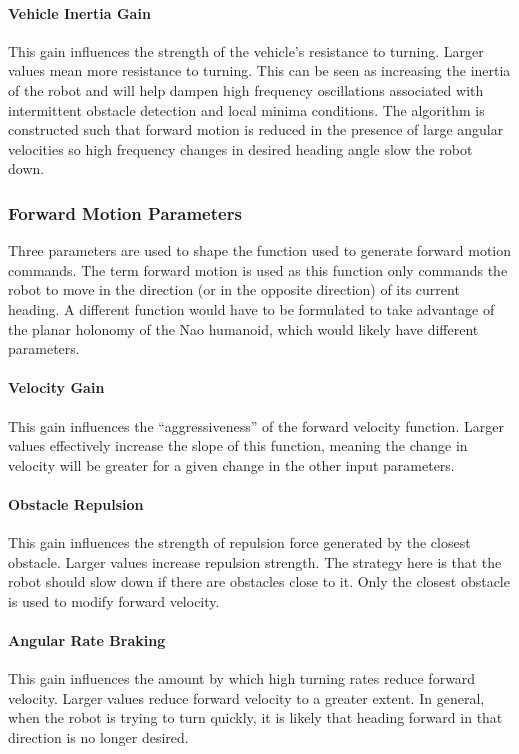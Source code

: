 \paragraph{Vehicle Inertia Gain}            
This gain influences the strength of the vehicle's resistance 
to turning. Larger values mean more resistance to turning. This can be seen
as increasing the inertia of the robot and will help dampen high frequency oscillations
associated with intermittent obstacle detection and local minima conditions.
The algorithm is constructed such that forward motion is reduced in the presence of large
angular velocities so high frequency changes in desired heading angle slow the robot down.

\subsubsection{Forward Motion Parameters}
Three parameters are used to shape the function used to generate forward motion
commands. The term forward motion is used as this function only commands the
robot to move in the direction (or in the opposite direction) of its current heading.
A different function would have to be formulated to take advantage of the planar
holonomy of the Nao humanoid, which would likely have different parameters.

\paragraph{Velocity Gain}              
This gain influences the ``aggressiveness'' of the forward velocity function. 
Larger values effectively increase the slope of this function, meaning the change in
velocity will be greater for a given change in the other input parameters.

\paragraph{Obstacle Repulsion}  
This gain influences the strength of repulsion force generated by the closest obstacle.
Larger values increase repulsion strength.
The strategy here is that the robot should slow down if there are obstacles close to it.
Only the closest obstacle is used to modify forward velocity.

\paragraph{Angular Rate Braking}        
This gain influences the amount by which high turning rates reduce forward velocity.
Larger values reduce forward velocity to a greater extent.
In general, when the robot is trying to turn quickly, it is likely that heading forward in that
direction is no longer desired.

